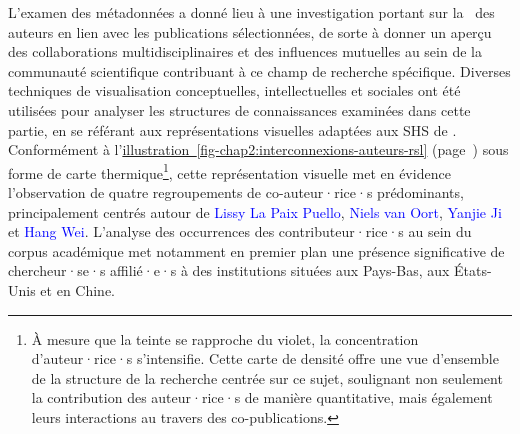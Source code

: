 \begin{refsegment}
L'examen des métadonnées a donné lieu à une investigation portant sur la ~des auteurs en lien avec les publications sélectionnées, de sorte à donner un aperçu des collaborations multidisciplinaires et des influences mutuelles au sein de la communauté scientifique contribuant à ce champ de recherche spécifique. Diverses techniques de visualisation conceptuelles, intellectuelles et sociales \textcolor{blue}{\autocite[559]{fortuna_global_2020}} ont été utilisées pour analyser les structures de connaissances examinées dans cette partie, en se référant aux représentations visuelles adaptées aux \acrshort{SHS} de \textcolor{blue}{\textcite[94-97]{ballouk_analyse_2021}}. Conformément à l'\hyperref[fig-chap2:interconnexions-auteurs-rsl]{illustration~\ref{fig-chap2:interconnexions-auteurs-rsl}} (page~\pageref{fig-chap2:interconnexions-auteurs-rsl}) sous forme de carte thermique\footnote{
    À mesure que la teinte se rapproche du violet, la concentration d'auteur·rice·s s'intensifie. Cette carte de densité offre une vue d'ensemble de la structure de la recherche centrée sur ce sujet, soulignant non seulement la contribution des auteur·rice·s de manière quantitative, mais également leurs interactions au travers des co-publications.
}, cette représentation visuelle met en évidence l'observation de quatre regroupements de co-auteur·rice·s prédominants, principalement centrés autour de \textcolor{blue}{Lissy La Paix Puello}, \textcolor{blue}{Niels van Oort}, \textcolor{blue}{Yanjie Ji} et \textcolor{blue}{Hang Wei}. L'analyse des occurrences des contributeur·rice·s au sein du corpus académique met notamment en premier plan une présence significative de chercheur·se·s affilié·e·s à des institutions situées aux Pays-Bas, aux États-Unis et en Chine.
    \begin{customitemize}

\end{customitemize}
\end{refsegment}
